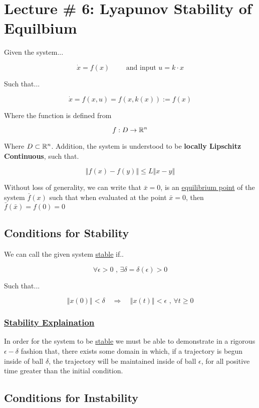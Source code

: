 \section*{Lecture \# 6: Lyapunov Stability of Equilbium}


Given the system...


$$
\dot{x} = f(x) \quad \quad \text{ and input } u = k\cdot x
$$

\noindent Such that...

$$
\dot{x} = f(x,u) = f(x, k(x)) :=f(x)
$$

\noindent Where the function is defined from

$$
f: D \rightarrow \mathbb{R}^n
$$

\noindent Where $D\subset \mathbb{R}^n$. Addition, the system is understood to be \textbf{locally Lipschitz Continuous}, such that.

$$
\left\Vert f(x) - f(y) \right\Vert \leq L \left \Vert x - y \right\Vert
$$

\noindent Without loss of generality, we can write that $ \bar{x} = 0
$, is an \underline{equilibrium point} of the system $\bar{f}(x)$ such that when evaluated at the point $\bar{x} = 0$, then $\bar{f}(\bar{x}) = f(0) = 0 $

\subsection*{Conditions for Stability}

We can call the given system \underline{stable} if..

$$
\forall \epsilon > 0 \text{ , } \exists \delta = \delta(\epsilon) > 0
$$

\noindent Such that...

$$
\left\Vert x(0)\right\Vert < \delta \quad \Rightarrow \quad \left\Vert x(t)\right\Vert < \epsilon \text{ , } \forall t \geq 0
$$

\subsubsection*{\underline{Stability Explaination}}

In order for the system to be \underline{stable} we must be able to demonstrate in a rigorous $\epsilon-\delta$ fashion that, there exists some domain in which, if a trajectory is begun inside of ball $\delta$, the trajectory will be maintained inside of ball $\epsilon$, for all positive time greater than the initial condition.


\subsection*{Conditions for Instability}

